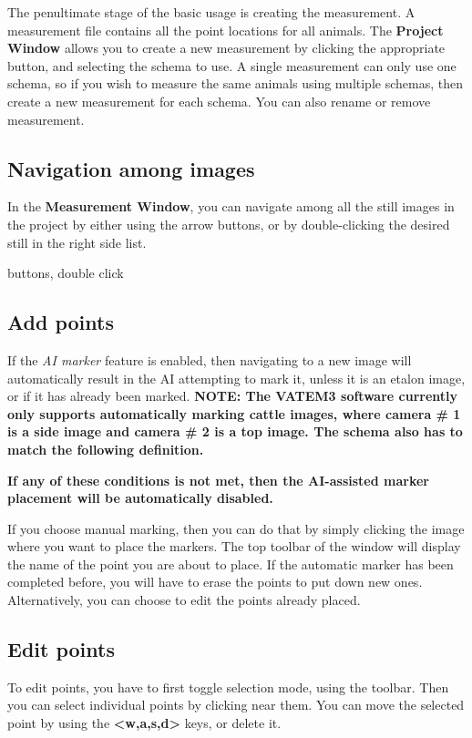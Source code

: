 \documentclass[10pt,a4paper,oneside]{report}             %
\begin{document}
The penultimate stage of the basic usage is creating the measurement. A measurement file contains all the point locations for all animals. The \textbf{Project Window} allows you to create a new measurement by clicking the appropriate button, and selecting the schema to use. A single measurement can only use one schema, so if you wish to measure the same animals using multiple schemas, then create a new measurement for each schema. You can also rename or remove measurement. 

\subsection{Navigation among images}

In the \textbf{Measurement Window}, you can navigate among all the still images in the project by either using the arrow buttons, or by double-clicking the desired still in the right side list.

buttons, double click

\subsection{Add points}

If the \textit{AI marker} feature is enabled, then navigating to a new image will automatically result in the AI attempting to mark it, unless it is an etalon image, or if it has already been marked. \textbf{NOTE: The VATEM3 software currently only supports automatically marking cattle images, where camera \# 1 is  a side image and camera \# 2 is a top image. The schema also has to match the following definition.}

\textbf{If any of these conditions is not met, then the AI-assisted marker placement will be automatically disabled.}

If you choose manual marking, then you can do that by simply clicking the image where you want to place the markers. The top toolbar of the window will display the name of the point you are about to place. If the automatic marker has been completed before, you will have to erase the points to put down new ones. Alternatively, you can choose to edit the points already placed.

\subsection{Edit points}

To edit points, you have to first toggle selection mode, using the toolbar. Then you can select individual points by clicking near them. You can move the selected point by using the \textbf{<w,a,s,d>} keys, or delete it.
\end{document}
